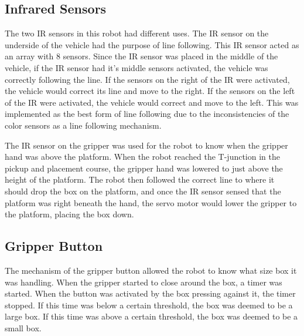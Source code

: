\documentclass[11pt]{report}
\begin{document}
\subsection{Infrared Sensors}
The two \gls{IR} sensors in this robot had different uses. The \gls{IR} sensor on the underside of the vehicle had the purpose of line following. This \gls{IR} sensor acted as an array with 8 sensors. Since the \gls{IR} sensor was placed in the middle of the vehicle, if the \gls{IR} sensor had it's middle sensors activated, the vehicle was correctly following the line. If the sensors on the right of the \gls{IR} were activated, the vehicle would correct its line and move to the right. If the sensors on the left of the \gls{IR} were activated, the vehicle would correct and move to the left. This was implemented as the best form of line following due to the inconsistencies of the color sensors as a line following mechanism. 
\par The \gls{IR} sensor on the gripper was used for the robot to know when the gripper hand was above the platform. When the robot reached the T-junction in the pickup and placement course, the gripper hand was lowered to just above the height of the platform. The robot then followed the correct line to where it should drop the box on the platform, and once the \gls{IR} sensor sensed that the platform was right beneath the hand, the servo motor would lower the gripper to the platform, placing the box down.

\subsection{Gripper Button}
The mechanism of the gripper button allowed the robot to know what size box it was handling. When the gripper started to close around the box, a timer was started. When the button was activated by the box pressing against it, the timer stopped. If this time was below a certain threshold, the box was deemed to be a large box. If this time was above a certain threshold, the box was deemed to be a small box. 
\end{document}
